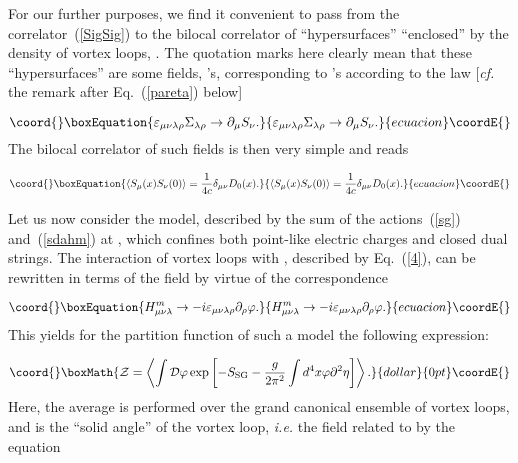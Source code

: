 \documentclass[a4paper,12pt]{article}
\begin{document}
For our further purposes, we find it convenient to pass from the correlator~(\ref{SigSig}) to the 
bilocal correlator of ``hypersurfaces'' ``enclosed'' by the density of vortex loops, \coordHE{}.
The quotation marks here clearly mean that these ``hypersurfaces'' are some fields, \coordHE{}'s, corresponding
to \myHighlight{$\Sigma_{\mu\nu}$}\coordHE{}'s according to the law [{\it cf.} the remark after Eq.~(\ref{pareta}) below]

\begin{equation}\coord{}\boxEquation{
\label{law}
\varepsilon_{\mu\nu\lambda\rho}\Sigma_{\lambda\rho}\to
\partial_\mu S_\nu.
}{
\varepsilon_{\mu\nu\lambda\rho}\Sigma_{\lambda\rho}\to
\partial_\mu S_\nu.
}{ecuacion}\coordE{}\end{equation}
The bilocal correlator of such fields is then very simple and reads

\begin{equation}\coord{}\boxEquation{
\label{SS}
\left<S_\mu(x)S_\nu(0)\right>=\frac{1}{4c}\delta_{\mu\nu}D_0(x).
}{
\left<S_\mu(x)S_\nu(0)\right>=\frac{1}{4c}\delta_{\mu\nu}D_0(x).
}{ecuacion}\coordE{}\end{equation}

Let us now consider the model, described by the sum of the actions~(\ref{sg}) 
and~(\ref{sdahm}) at \myHighlight{$\eta\to\infty$}\coordHE{}, 
which confines both point-like electric charges and closed dual strings. 
The interaction of vortex loops with \coordHE{}, described by Eq.~(\ref{4}),
can be rewritten in terms of the field \myHighlight{$\varphi$}\coordHE{} by virtue of the correspondence 

\begin{equation}\coord{}\boxEquation{
\label{Hph}
H_{\mu\nu\lambda}^m
\to-i\varepsilon_{\mu\nu\lambda\rho}\partial_\rho\varphi.
}{
H_{\mu\nu\lambda}^m
\to-i\varepsilon_{\mu\nu\lambda\rho}\partial_\rho\varphi.
}{ecuacion}\coordE{}\end{equation}  
This yields for the partition function 
of such a model the following expression:

$$\coord{}\boxMath{{\cal Z}=\left<\int {\cal D}\varphi\exp\left[-S_{\rm SG}
-\frac{g}{2\pi^2}\int d^4x\varphi\partial^2\eta\right]\right>.}{dollar}{0pt}\coordE{}$$
Here, the average is performed over the 
grand canonical ensemble of vortex loops, and \coordHE{} is the ``solid angle'' of the vortex loop, {\it i.e.}
the field related to \coordHE{} by the equation 
\end{document}
